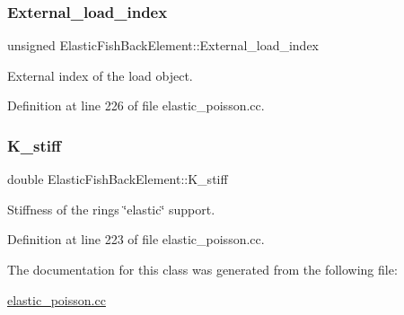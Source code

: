 \subsubsection{\texorpdfstring{External\+\_\+load\+\_\+index}{External\_load\_index}}
{\footnotesize\ttfamily unsigned Elastic\+Fish\+Back\+Element\+::\+External\+\_\+load\+\_\+index\hspace{0.3cm}{\ttfamily [private]}}



External index of the load object. 



Definition at line 226 of file elastic\+\_\+poisson.\+cc.

\mbox{\label{classElasticFishBackElement_abb0ba4fd55ef0c0b48634eded475e5c7}} 
\subsubsection{\texorpdfstring{K\+\_\+stiff}{K\_stiff}}
{\footnotesize\ttfamily double Elastic\+Fish\+Back\+Element\+::\+K\+\_\+stiff\hspace{0.3cm}{\ttfamily [private]}}



Stiffness of the ring\textquotesingle{}s \char`\"{}elastic\char`\"{} support. 



Definition at line 223 of file elastic\+\_\+poisson.\+cc.



The documentation for this class was generated from the following file\+:\begin{DoxyCompactItemize}
\item 
\hyperlink{elastic__poisson_8cc}{elastic\+\_\+poisson.\+cc}\end{DoxyCompactItemize}
